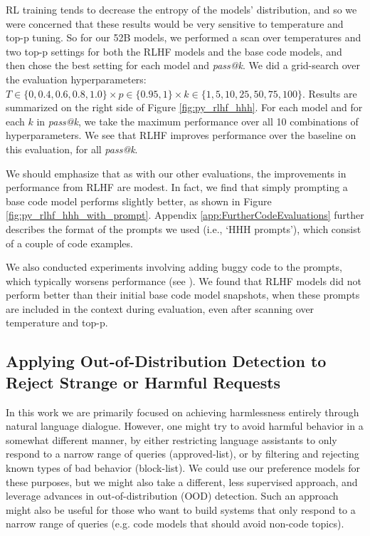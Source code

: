 RL training tends to decrease the entropy of the models' distribution, and so we were concerned that these results would be very sensitive to temperature and top-p tuning.  So for our 52B models, we performed a scan over temperatures and two top-p settings for both the RLHF models and the base code models, and then chose the best setting for each model and \textit{pass@k}. We did a grid-search  over the evaluation hyperparameters: $T \in \{0, 0.4, 0.6, 0.8, 1.0\} \times p \in \{0.95, 1\} \times k \in \{1, 5, 10, 25, 50, 75, 100\}$. Results are summarized on the right side of Figure \ref{fig:py_rlhf_hhh}. For each model and for each $k$ in \textit{pass@k}, we take the maximum  performance over all 10 combinations of hyperparameters. We see that RLHF improves performance over the baseline on this evaluation, for all \textit{pass@k}.

We should emphasize that as with our other evaluations, the improvements in performance from RLHF are modest. In fact, we find that simply prompting a base code model performs slightly better, as shown in Figure \ref{fig:py_rlhf_hhh_with_prompt}. Appendix \ref{app:FurtherCodeEvaluations} further describes the format of the prompts we used (i.e., `HHH prompts'), which consist of a couple of code examples.

We also conducted experiments involving adding buggy code to the prompts, which typically worsens performance (see \cite{chen2021codex}). We found that RLHF models did not perform better than their initial base code model snapshots, when these prompts are included in the context during evaluation, even after scanning over temperature and top-p.

\subsection{Applying Out-of-Distribution Detection to Reject Strange or Harmful Requests}
\label{sec:OOD}

In this work we are primarily focused on achieving harmlessness entirely through natural language dialogue.  However, one might try to avoid harmful behavior in a somewhat different manner, by either restricting language assistants to only respond to a narrow range of queries (approved-list), or by filtering and rejecting known types of bad behavior (block-list).  We could use our preference models for these purposes, but we might also take a different, less supervised approach, and leverage advances in out-of-distribution (OOD) detection.  Such an approach might also be useful for those who want to build systems that only respond to a narrow range of queries (e.g. code models that should avoid non-code topics).

